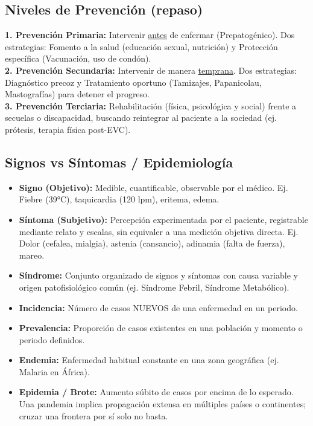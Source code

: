 \subsection{Niveles de Prevención (repaso)}
\begin{tcolorbox}[colback=orange!5!white,colframe=orange!80!black,title=Los 3 Niveles Prevencionistas Clásicos]
\textbf{1. Prevención Primaria:} Intervenir \underline{antes} de enfermar (Prepatogénico). Dos estrategias: Fomento a la salud (educación sexual, nutrición) y Protección específica (Vacunación, uso de condón).\\
\textbf{2. Prevención Secundaria:} Intervenir de manera \underline{temprana}. Dos estrategias: Diagnóstico precoz y Tratamiento oportuno (Tamizajes, Papanicolau, Mastografías) para detener el progreso.\\
\textbf{3. Prevención Terciaria:} Rehabilitación (física, psicológica y social) frente a secuelas o discapacidad, buscando reintegrar al paciente a la sociedad (ej. prótesis, terapia física post-EVC).
\end{tcolorbox}

\subsection{Signos vs Síntomas / Epidemiología}
\begin{itemize}
    \item \textbf{Signo (Objetivo):} Medible, cuantificable, observable por el médico. Ej. Fiebre (39°C), taquicardia (120 lpm), eritema, edema.
    \item \textbf{Síntoma (Subjetivo):} Percepción experimentada por el paciente, registrable mediante relato y escalas, sin equivaler a una medición objetiva directa. Ej. Dolor (cefalea, mialgia), astenia (cansancio), adinamia (falta de fuerza), mareo.
    \item \textbf{Síndrome:} Conjunto organizado de signos y síntomas con causa variable y origen patofisiológico común (ej. Síndrome Febril, Síndrome Metabólico).
    \item \textbf{Incidencia:} Número de casos NUEVOS de una enfermedad en un periodo.
    \item \textbf{Prevalencia:} Proporción de casos existentes en una población y momento o periodo definidos.
    \item \textbf{Endemia:} Enfermedad habitual constante en una zona geográfica (ej. Malaria en África).
    \item \textbf{Epidemia / Brote:} Aumento súbito de casos por encima de lo esperado. Una pandemia implica propagación extensa en múltiples países o continentes; cruzar una frontera por sí solo no basta.
\end{itemize}

